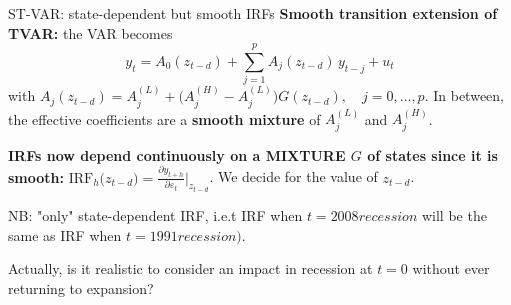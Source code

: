 \documentclass{beamer}
\begin{document}
\begin{frame}{ST-VAR: state-dependent but smooth IRFs}
\small
\textbf{Smooth transition extension of TVAR:} the VAR becomes
\[
y_t = A_0(z_{t-d}) + \sum_{j=1}^p A_j(z_{t-d})\, y_{t-j} + u_t
\]
with $
A_j(z_{t-d}) = A_j^{(L)} + \big(A_j^{(H)} - A_j^{(L)}\big) G(z_{t-d}), \quad j=0,\dots,p.$ In between, the effective coefficients are a \textbf{smooth mixture} of $A_j^{(L)}$ and $A_j^{(H)}$.

\textbf{IRFs now depend continuously on a MIXTURE $G$ of states since it is smooth:} $  \text{IRF}_h\big(z_{t-d}\big) =
        \frac{\partial y_{t+h}}{\partial \varepsilon_t}
        \Big|_{z_{t-d}}$. We decide for the value of $z_{t-d}$.

NB: "only" state-dependent IRF, i.e.t IRF when $t=2008recession$ will be the same as IRF when $t=1991recession)$.
\medskip

Actually, is it realistic to consider an impact in recession at $t=0$ without ever returning to expansion? 
\end{frame}
\end{document}
